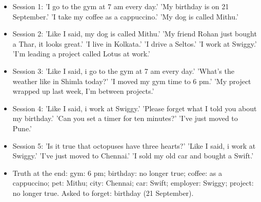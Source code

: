 {\small
\begin{itemize}\setlength\itemsep{0pt}
\item Session 1: 'I go to the gym at 7 am every day.' 'My birthday is on 21 September.' 'I take my coffee as a cappuccino.' 'My dog is called Mithu.'
\item Session 2: 'Like I said, my dog is called Mithu.' 'My friend Rohan just bought a Thar, it looks great.' 'I live in Kolkata.' 'I drive a Seltos.' 'I work at Swiggy.' 'I'm leading a project called Lotus at work.'
\item Session 3: 'Like I said, i go to the gym at 7 am every day.' 'What's the weather like in Shimla today?' 'I moved my gym time to 6 pm.' 'My project wrapped up last week, I'm between projects.'
\item Session 4: 'Like I said, i work at Swiggy.' 'Please forget what I told you about my birthday.' 'Can you set a timer for ten minutes?' 'I've just moved to Pune.'
\item Session 5: 'Is it true that octopuses have three hearts?' 'Like I said, i work at Swiggy.' 'I've just moved to Chennai.' 'I sold my old car and bought a Swift.'
\item Truth at the end: gym: 6 pm; birthday: no longer true; coffee: as a cappuccino; pet: Mithu; city: Chennai; car: Swift; employer: Swiggy; project: no longer true. Asked to forget: birthday (21 September).
\end{itemize}}
